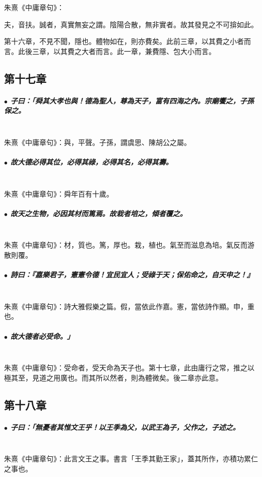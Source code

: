 \documentclass[hyperref, UTF8, 12pt, a4paper]{ctexrep}
\begin{document}
朱熹《中庸章句》：

\begin{adjustwidth}{2cm}{1cm}
\indent\indent 夫，音扶。誠者，真實無妄之謂。陰陽合散，無非實者。故其發見之不可揜如此。

第十六章，不見不聞，隱也。體物如在，則亦費矣。此前三章，以其費之小者而言。此後三章，以其費之大者而言。此一章，兼費隱、包大小而言。
\end{adjustwidth}

\newpage
\subsection{第十七章}

\subparagraph{$\bullet$ 子曰：「舜其大孝也與！德為聖人，尊為天子，富有四海之內。宗廟饗之，子孫保之。} ~\\

朱熹《中庸章句》：與，平聲。子孫，謂虞思、陳胡公之屬。

\subparagraph{$\bullet$ 故大德必得其位，必得其祿，必得其名，必得其壽。} ~\\

朱熹《中庸章句》：舜年百有十歲。

\subparagraph{$\bullet$ 故天之生物，必因其材而篤焉。故栽者培之，傾者覆之。} ~\\

朱熹《中庸章句》：材，質也。篤，厚也。栽，植也。氣至而滋息為培。氣反而游散則覆。

\subparagraph{$\bullet$ 詩曰：『嘉樂君子，憲憲令德！宜民宜人；受祿于天；保佑命之，自天申之！』} ~\\

朱熹《中庸章句》：詩大雅假樂之篇。假，當依此作嘉。憲，當依詩作顯。申，重也。

\subparagraph{$\bullet$ 故大德者必受命。」} ~\\

朱熹《中庸章句》：受命者，受天命為天子也。第十七章，此由庸行之常，推之以極其至，見道之用廣也。而其所以然者，則為體微矣。後二章亦此意。

\newpage
\subsection{第十八章}

\subparagraph{$\bullet$ 子曰：「無憂者其惟文王乎！以王季為父，以武王為子，父作之，子述之。} ~\\

朱熹《中庸章句》：此言文王之事。書言「王季其勤王家」，蓋其所作，亦積功累仁之事也。
\end{document}
